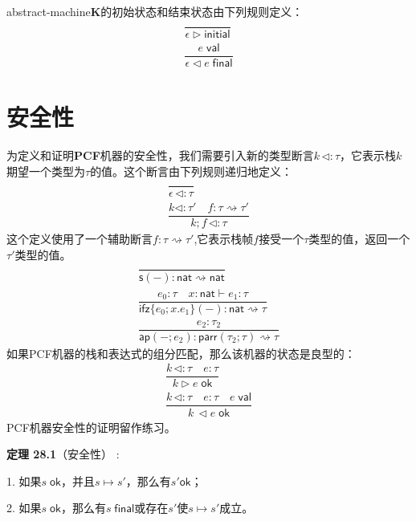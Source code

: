 \gls{abstract-machine}\textbf{K}的初始状态和结束状态由下列规则定义：
\begin{subequations}
    \begin{gather}
       \dfrac{}{\epsilon \triangleright \mathsf{initial}}\\
       \dfrac{e \; \mathsf{val}}{\epsilon \triangleleft e \; \mathsf{final}}
    \end{gather}
\end{subequations}

\section{安全性}
为定义和证明\textbf{PCF}机器的安全性，我们需要引入新的类型断言$k \, \triangleleft : \tau $，它表示栈$k$期望一个类型为$\tau$的值。这个断言由下列规则递归地定义：
\begin{subequations}
    \begin{gather}
       \dfrac{}{\epsilon \, \triangleleft : \tau}\\
       \dfrac{k \triangleleft : \tau ' \quad f: \tau \rightsquigarrow \tau '}{k;f \, \triangleleft : \tau}
    \end{gather}
\end{subequations}
这个定义使用了一个辅助断言$f: \tau \rightsquigarrow \tau '$,它表示栈帧$f$接受一个$\tau$类型的值，返回一个$\tau '$类型的值。
\begin{subequations}
    \begin{gather}
       \dfrac{}{\mathsf{s} (-): \mathsf{nat} \rightsquigarrow \mathsf{nat}}\\
       \dfrac{e_0: \tau \quad x: \mathsf{nat} \vdash e_1: \tau}{\mathsf{ifz} \{ e_0;x.e_1 \} (-): \mathsf{nat} \rightsquigarrow \tau}\\
       \dfrac{e_2: \tau_2}{\mathsf{ap} (-;e_2): \mathsf{parr} ( \tau_2 ; \tau ) \rightsquigarrow \tau}
    \end{gather}
\end{subequations}
如果PCF机器的栈和表达式的组分匹配，那么该机器的状态是良型的：
\begin{subequations}
    \begin{gather}
       \dfrac{k \, \triangleleft : \tau \quad e: \tau}{k \triangleright e \; \mathsf{ok}}\\
       \dfrac{k \, \triangleleft : \tau \quad e: \tau \quad e \; \mathsf{val}}{k \, \triangleleft e \; \mathsf{ok}}
    \end{gather}
\end{subequations}
PCF机器安全性的证明留作练习。

\textbf{定理 28.1}（安全性） :

1. 如果$s \; \mathsf{ok}$，并且$s \longmapsto s'$，那么有$s' \mathsf{ok}$；

2. 如果$s \; \mathsf{ok}$，那么有$s \; \mathsf{final}$或存在$s'$使$s \longmapsto s'$成立。
